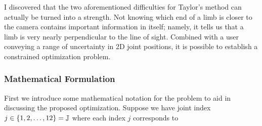 \documentclass[final]{article}
\begin{document}
\begin{spacing}{1.1}
I discovered that the two aforementioned difficulties for Taylor's method can actually be turned into a strength. Not knowing which end of a limb is closer to the camera contains important information in itself; namely, it tells us that a limb is very nearly perpendicular to the line of sight. Combined with a user conveying a range of uncertainty in 2D joint positions, it is possible to establish a constrained optimization problem.

\subsubsection{Mathematical Formulation}
First we introduce some mathematical notation for the problem to aid in discussing the proposed optimization. Suppose we have joint index $j \in \qty{1,2,\ldots,12} = \mathbb{J} $ where each index $j$ corresponds to


\end{spacing}
\end{document}
